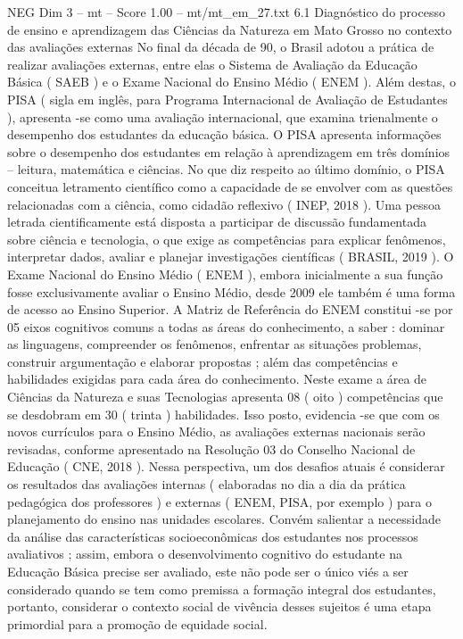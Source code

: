 \begin{textsample}{NEG Dim 3 – mt – Score 1.00 – mt/mt\_em\_27.txt}  \label{ex:f3_neg_213}
6.1 Diagnóstico do processo de ensino e aprendizagem das Ciências da Natureza em Mato Grosso no contexto das avaliações externas No final da década de 90, o Brasil adotou a prática de realizar avaliações externas, entre elas o Sistema de Avaliação da Educação Básica ( SAEB ) e o Exame Nacional do Ensino Médio ( ENEM ).
Além destas, o PISA ( sigla em inglês, para Programa Internacional de Avaliação de Estudantes ), apresenta -se como uma avaliação internacional, que examina trienalmente o desempenho dos estudantes da educação básica.
O PISA apresenta informações sobre o desempenho dos estudantes em relação à aprendizagem em três domínios – leitura, matemática e ciências.
No que diz respeito ao último domínio, o PISA conceitua letramento científico como a capacidade de se envolver com as questões relacionadas com a ciência, como cidadão reflexivo ( INEP, 2018 ).
Uma pessoa letrada cientificamente está disposta a participar de discussão fundamentada sobre ciência e tecnologia, o que exige as competências para explicar fenômenos, interpretar dados, avaliar e planejar investigações científicas ( BRASIL, 2019 ).
O Exame Nacional do Ensino Médio ( ENEM ), embora inicialmente a sua função fosse exclusivamente avaliar o Ensino Médio, desde 2009 ele também é uma forma de acesso ao Ensino Superior.
A Matriz de Referência do ENEM constitui -se por 05 eixos cognitivos comuns a todas as áreas do conhecimento, a saber : dominar as linguagens, compreender os fenômenos, enfrentar as situações problemas, construir argumentação e elaborar propostas ; além das competências e habilidades exigidas para cada área do conhecimento.
Neste exame a área de Ciências da Natureza e suas Tecnologias apresenta 08 ( oito ) competências que se desdobram em 30 ( trinta ) habilidades.
Isso posto, evidencia -se que com os novos currículos para o Ensino Médio, as avaliações externas nacionais serão revisadas, conforme apresentado na Resolução 03 do Conselho Nacional de Educação ( CNE, 2018 ).
Nessa perspectiva, um dos desafios atuais é considerar os resultados das avaliações internas ( elaboradas no dia a dia da prática pedagógica dos professores ) e externas ( ENEM, PISA, por exemplo ) para o planejamento do ensino nas unidades escolares.
Convém salientar a necessidade da análise das características socioeconômicas dos estudantes nos processos avaliativos ; assim, embora o desenvolvimento cognitivo do estudante na Educação Básica precise ser avaliado, este não pode ser o único viés a ser considerado quando se tem como premissa a formação integral dos estudantes, portanto, considerar o contexto social de vivência desses sujeitos é uma etapa primordial para a promoção de equidade social.

\end{textsample}
